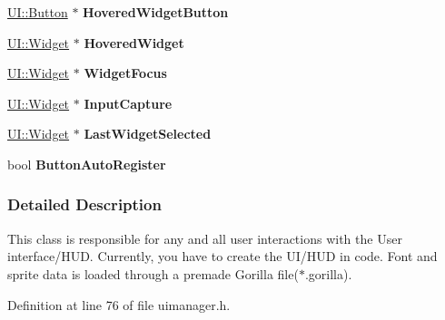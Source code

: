\begin{DoxyCompactItemize}
\item 
\hypertarget{classphys_1_1UIManager_aed72bede8e73d9d083e6faf352e60c0d}{
\hyperlink{classphys_1_1UI_1_1Button}{UI::Button} $\ast$ {\bfseries HoveredWidgetButton}}
\label{d5/dc5/classphys_1_1UIManager_aed72bede8e73d9d083e6faf352e60c0d}

\item 
\hypertarget{classphys_1_1UIManager_a3bcf192e061273695e99a85484c5056a}{
\hyperlink{classphys_1_1UI_1_1Widget}{UI::Widget} $\ast$ {\bfseries HoveredWidget}}
\label{d5/dc5/classphys_1_1UIManager_a3bcf192e061273695e99a85484c5056a}

\item 
\hypertarget{classphys_1_1UIManager_a932c928b9246717725c264326660bd6d}{
\hyperlink{classphys_1_1UI_1_1Widget}{UI::Widget} $\ast$ {\bfseries WidgetFocus}}
\label{d5/dc5/classphys_1_1UIManager_a932c928b9246717725c264326660bd6d}

\item 
\hypertarget{classphys_1_1UIManager_aefa756d0c982299df8567e92c9de6c46}{
\hyperlink{classphys_1_1UI_1_1Widget}{UI::Widget} $\ast$ {\bfseries InputCapture}}
\label{d5/dc5/classphys_1_1UIManager_aefa756d0c982299df8567e92c9de6c46}

\item 
\hypertarget{classphys_1_1UIManager_aac5b0665a4703cf3d10cda216cbb9def}{
\hyperlink{classphys_1_1UI_1_1Widget}{UI::Widget} $\ast$ {\bfseries LastWidgetSelected}}
\label{d5/dc5/classphys_1_1UIManager_aac5b0665a4703cf3d10cda216cbb9def}

\item 
\hypertarget{classphys_1_1UIManager_a7c4cec440bfdfe8d1c1b0bf052edd842}{
bool {\bfseries ButtonAutoRegister}}
\label{d5/dc5/classphys_1_1UIManager_a7c4cec440bfdfe8d1c1b0bf052edd842}

\end{DoxyCompactItemize}


\subsubsection{Detailed Description}
This class is responsible for any and all user interactions with the User interface/HUD. Currently, you have to create the UI/HUD in code. Font and sprite data is loaded through a premade Gorilla file($\ast$.gorilla). 

Definition at line 76 of file uimanager.h.



